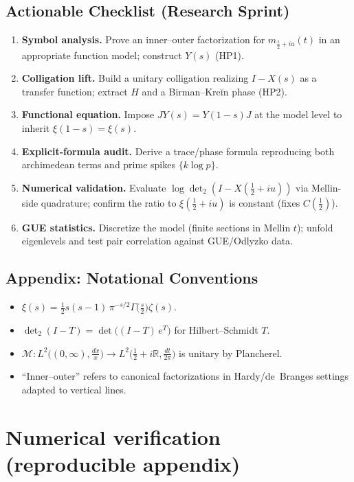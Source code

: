 \documentclass[11pt]{article}
\numberwithin{equation}{section}
\theoremstyle{definition}
\theoremstyle{remark}
\newcommand{\1}{\mathbbm{1}}
\begin{document}
\subsection{Actionable Checklist (Research Sprint)}

\begin{enumerate}
  \item \textbf{Symbol analysis.} Prove an inner–outer factorization for \(m_{\frac12+iu}(t)\) in an appropriate function model; construct \(Y(s)\) (HP1).
  \item \textbf{Colligation lift.} Build a unitary colligation realizing \(I-X(s)\) as a transfer function; extract \(H\) and a Birman–Kreĭn phase (HP2).
  \item \textbf{Functional equation.} Impose \(JY(s)=Y(1-s)J\) at the model level to inherit \(\xi(1-s)=\xi(s)\).
  \item \textbf{Explicit-formula audit.} Derive a trace/phase formula reproducing both archimedean terms and prime spikes \(\{k\log p\}\).
  \item \textbf{Numerical validation.} Evaluate \(\log\det_{2}(I-X(\tfrac12+iu))\) via Mellin-side quadrature; confirm the ratio to \(\xi(\tfrac12+iu)\) is constant (fixes \(C(\tfrac12)\)).
  \item \textbf{GUE statistics.} Discretize the model (finite sections in Mellin \(t\)); unfold eigenlevels and test pair correlation against GUE/Odlyzko data.
\end{enumerate}

\subsection{Appendix: Notational Conventions}

\begin{itemize}
  \item \(\displaystyle \xi(s)=\tfrac12 s(s-1)\,\pi^{-s/2}\Gamma\!\big(\tfrac{s}{2}\big)\zeta(s)\).
  \item \(\det_{2}(I-T)=\det\!\big((I-T)\,e^{T}\big)\) for Hilbert–Schmidt \(T\).
  \item \(\mathcal{M}:L^2\!\big((0,\infty),\tfrac{dx}{x}\big)\to L^2\!\big(\tfrac12+i\mathbb{R},\tfrac{dt}{2\pi}\big)\) is unitary by Plancherel.
  \item ``Inner–outer'' refers to canonical factorizations in Hardy/de~Branges settings adapted to vertical lines.
\end{itemize}


\section{Numerical verification (reproducible appendix)}\label{sec:Numerics}
\end{document}
